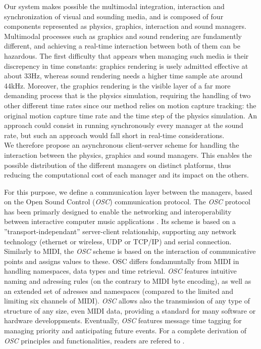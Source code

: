 Our system makes possible the multimodal integration, interaction and synchronization of visual and sounding media, and is composed of four components represented as physics, graphics, interaction and sound managers.\\

Multimodal processes such as graphics and sound rendering are fundamently different, and achieving a real-time interaction between both of them can be hazardous. The first difficulty that appears when managing such media is their discrepency in time constants: graphics rendering is usely admitted effective at about 33Hz, whereas sound rendering needs a higher time sample ate around 44kHz. Moreover, the graphics rendering is the visible layer of a far more demanding process that is the physics simulation, requiring the handling of two other different time rates since our method relies on motion capture tracking: the original motion capture time rate and the time step of the physics simulation. An approach could consist in running synchronously every manager at the sound rate, but such an approach would fall short in real-time considerations.\\

We therefore propose an asynchronous client-server scheme for handling the interaction between the physics, graphics and sound managers. This enables the possible distribution of the different managers on distinct platforms, thus reducing the computational cost of each manager and its impact on the others.

For this purpose, we define a communication layer between the managers, based on the  Open Sound Control (\emph{OSC}) communication protocol. The \emph{OSC} protocol has been primarly designed to enable the networking and interoperability between interactive computer music applications . Its scheme is based on a ''transport-independant'' server-client relationship, supporting any network technology (ethernet or wireless, UDP or TCP/IP) and serial connection. Similarly to MIDI, the \emph{OSC} scheme is based on the interaction of communicative points and assigns values to these. OSC differs fondamuntally from MIDI in handling namespaces, data types and time retrieval. \emph{OSC} features intuitive naming and adressing rules (on the contrary to MIDI byte encoding), as well as an extended set of adresses and namespaces (compared to the limited and limiting six channels of MIDI). \emph{OSC} allows also the transmission of any type of structure of any size, even MIDI data, providing a standard for many software or hardware developpments. Eventually, \emph{OSC} features message time tagging for managing priority and anticipating future events. For a complete derivation of \emph{OSC} principles and functionalities, readers are refered to .
		
